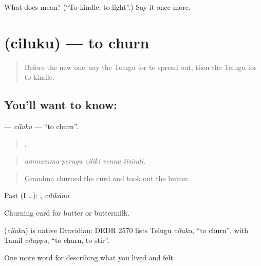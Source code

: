 \begin{tcolorbox}[breakable,colback=teal!4,colframe=teal!35!black,title={Before you move on}]
What does  mean? (\textquotedblleft{}To kindle; to light\textquotedblright{}.) Say it once more.
\end{tcolorbox}
\section[\texorpdfstring{\te{చిలుకు} (ciluku)}{చిలుకు (ciluku)}]{ (ciluku) — to churn}

\label{lesson:TE-C549-ciluku}



\begin{quote}
Before the new one: say the Telugu for to spread out, then the Telugu for to kindle.
\end{quote}

\subsection*{You'll want to know: }
\textbf{} — \emph{ciluku} — \textquotedblleft{}to churn\textquotedblright{}.

\begin{quote}
    .
\end{quote}

\begin{quote}
\emph{ammamma perugu ciliki venna tīsindi.}
\end{quote}

\begin{quote}
Grandma churned the curd and took out the butter.
\end{quote}

Past (I …): , \emph{cilikānu}.

Churning curd for butter or buttermilk.

\begin{cousinweb}
\textbf{} (\emph{ciluku}) is native Dravidian: DEDR 2570 lists Telugu \emph{ciluku}, \textquotedblleft{}to churn\textquotedblright{}, with Tamil \emph{ciluppu}, \textquotedblleft{}to churn, to stir\textquotedblright{}.
\end{cousinweb}

\begin{grammarlens}[title={What you've built}]
One more word for describing what you lived and felt.
\end{grammarlens}

